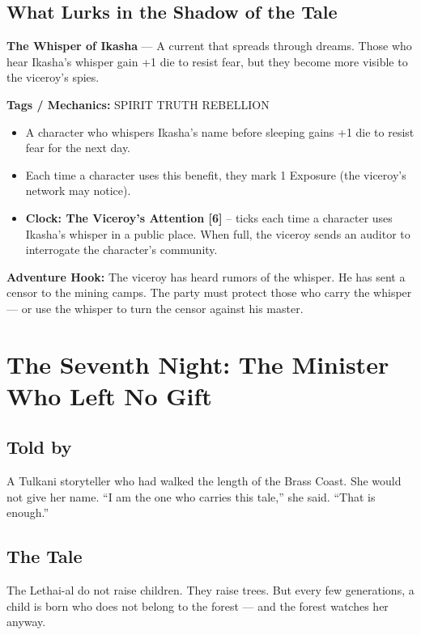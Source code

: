 \documentclass[10pt,twoside]{book}
\newcommand{\tag}[1]{\textsc{#1}}
\begin{document}
\section*{What Lurks in the Shadow of the Tale}
\begin{infobox}
\textbf{The Whisper of Ikasha} --- A current that spreads through dreams. Those who hear Ikasha's whisper gain +1 die to resist fear, but they become more visible to the viceroy's spies.

\textbf{Tags / Mechanics:} \tag{SPIRIT} \tag{TRUTH} \tag{REBELLION}

\begin{itemize}
\item A character who whispers Ikasha's name before sleeping gains +1 die to resist fear for the next day.
\item Each time a character uses this benefit, they mark 1 Exposure (the viceroy's network may notice).
\item \textbf{Clock: The Viceroy's Attention [6]} -- ticks each time a character uses Ikasha's whisper in a public place. When full, the viceroy sends an auditor to interrogate the character's community.
\end{itemize}

\textbf{Adventure Hook:} The viceroy has heard rumors of the whisper. He has sent a censor to the mining camps. The party must protect those who carry the whisper --- or use the whisper to turn the censor against his master.
\end{infobox}

\chapter{The Seventh Night: The Minister Who Left No Gift}

\section*{Told by}
A Tulkani storyteller who had walked the length of the Brass Coast. She would not give her name. ``I am the one who carries this tale,'' she said. ``That is enough.''

\section*{The Tale}

The Lethai-al do not raise children. They raise trees. But every few generations, a child is born who does not belong to the forest --- and the forest watches her anyway.
\end{document}

